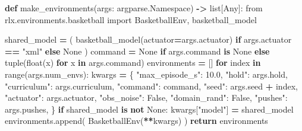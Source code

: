 \documentclass[
  american,
  11pt,
  letterpaper,
]{article}
\newenvironment{Shaded}{\begin{snugshade}}{\end{snugshade}}
\newcommand{\BuiltInTok}[1]{#1}
\newcommand{\ControlFlowTok}[1]{\textcolor[rgb]{0.13,0.29,0.53}{\textbf{#1}}}
\newcommand{\FloatTok}[1]{\textcolor[rgb]{0.00,0.00,0.81}{#1}}
\newcommand{\ImportTok}[1]{#1}
\newcommand{\KeywordTok}[1]{\textcolor[rgb]{0.13,0.29,0.53}{\textbf{#1}}}
\newcommand{\NormalTok}[1]{#1}
\newcommand{\OperatorTok}[1]{\textcolor[rgb]{0.81,0.36,0.00}{\textbf{#1}}}
\newcommand{\StringTok}[1]{\textcolor[rgb]{0.31,0.60,0.02}{#1}}
\newcommand{\VariableTok}[1]{\textcolor[rgb]{0.00,0.00,0.00}{#1}}
\renewenvironment{Shaded}{\par\smallskip}{\par\smallskip}
\begin{document}
\begin{Shaded}
\begin{Highlighting}[]
\KeywordTok{def}\NormalTok{ make\_environments(args: argparse.Namespace) }\OperatorTok{{-}\textgreater{}} \BuiltInTok{list}\NormalTok{[Any]:}
    \ImportTok{from}\NormalTok{ rlx.environments.basketball }\ImportTok{import}\NormalTok{ BasketballEnv, basketball\_model}

\NormalTok{    shared\_model }\OperatorTok{=}\NormalTok{ (}
\NormalTok{        basketball\_model(actuator}\OperatorTok{=}\NormalTok{args.actuator) }\ControlFlowTok{if}\NormalTok{ args.actuator }\OperatorTok{==} \StringTok{"xml"} \ControlFlowTok{else} \VariableTok{None}
\NormalTok{    )}
\NormalTok{    command }\OperatorTok{=} \VariableTok{None} \ControlFlowTok{if}\NormalTok{ args.command }\KeywordTok{is} \VariableTok{None} \ControlFlowTok{else} \BuiltInTok{tuple}\NormalTok{(}\BuiltInTok{float}\NormalTok{(x) }\ControlFlowTok{for}\NormalTok{ x }\KeywordTok{in}\NormalTok{ args.command)}
\NormalTok{    environments }\OperatorTok{=}\NormalTok{ []}
    \ControlFlowTok{for}\NormalTok{ index }\KeywordTok{in} \BuiltInTok{range}\NormalTok{(args.num\_envs):}
\NormalTok{        kwargs }\OperatorTok{=}\NormalTok{ \{}
            \StringTok{"max\_episode\_s"}\NormalTok{: }\FloatTok{10.0}\NormalTok{,}
            \StringTok{"hold"}\NormalTok{: args.hold,}
            \StringTok{"curriculum"}\NormalTok{: args.curriculum,}
            \StringTok{"command"}\NormalTok{: command,}
            \StringTok{"seed"}\NormalTok{: args.seed }\OperatorTok{+}\NormalTok{ index,}
            \StringTok{"actuator"}\NormalTok{: args.actuator,}
            \StringTok{"obs\_noise"}\NormalTok{: }\VariableTok{False}\NormalTok{,}
            \StringTok{"domain\_rand"}\NormalTok{: }\VariableTok{False}\NormalTok{,}
            \StringTok{"pushes"}\NormalTok{: args.pushes,}
\NormalTok{        \}}
        \ControlFlowTok{if}\NormalTok{ shared\_model }\KeywordTok{is} \KeywordTok{not} \VariableTok{None}\NormalTok{:}
\NormalTok{            kwargs[}\StringTok{"model"}\NormalTok{] }\OperatorTok{=}\NormalTok{ shared\_model}
\NormalTok{        environments.append(}
\NormalTok{            BasketballEnv(}\OperatorTok{**}\NormalTok{kwargs)}
\NormalTok{        )}
    \ControlFlowTok{return}\NormalTok{ environments}



\end{Highlighting}
\end{Shaded}
\end{document}
